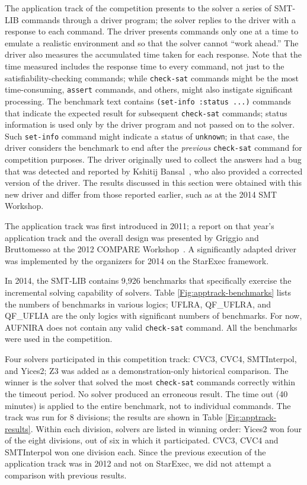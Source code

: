 \documentclass[twoside,11pt]{article}
\begin{document}
The application track of the competition presents to the solver a series of SMT-LIB commands through a driver program; the solver replies to the driver with a
response to each command. The driver presents commands only one at a time to emulate a realistic environment and so that the solver cannot ``work ahead.'' The driver also measures the accumulated time taken for each response. Note that the time measured includes the response time to every command, not just to the satisfiability-checking commands; while \lstinline{check-sat} commands might be the most time-consuming, \lstinline{assert} commands, and others, might also instigate significant processing. The benchmark text contains \lstinline{(set-info :status ...)} commands that
indicate the expected result for subsequent \lstinline{check-sat} commands; status information is used only by the driver program and not passed on to the solver. Such \lstinline{set-info} command might indicate a status of \lstinline{unknown}; in that case, the driver
considers the benchmark to end after the \emph{previous} \lstinline{check-sat} command for competition purposes.
The driver originally used to collect the answers had a bug that was
detected and reported by Kshitij Bansal~\cite{bansal2015email}, who
also provided a corrected version of the driver. The results discussed
in this section were obtained with this new driver and differ from those reported
earlier, such as at the 2014 SMT Workshop.

The application track was first introduced in 2011; a report on that year's application track and the overall design was presented by Griggio and Bruttomesso at the 2012 COMPARE Workshop~\cite{ag+rb+12}. A significantly adapted driver was implemented by the organizers for 2014 on the StarExec framework.

In 2014, the SMT-LIB contains 9,926 benchmarks that  specifically  exercise the incremental solving capability of solvers. Table \ref{Fig:apptrack-benchmarks} lists the numbers of benchmarks in various logics; UFLRA, QF\_UFLRA, and QF\_UFLIA are the only logics with significant numbers of benchmarks. For now, AUFNIRA does not contain any valid \lstinline{check-sat} command. All the benchmarks were used in the competition.

Four solvers participated in this competition track: CVC3, CVC4, SMTInterpol, and Yices2; Z3 was added as a demonstration-only historical comparison. The winner is the solver that solved the most \lstinline{check-sat} commands correctly within the timeout period. No solver produced an erroneous result. The time out (40 minutes) is applied to the entire benchmark, not to individual commands. The track was run for 8 divisions; the results are shown in Table \ref{Fig:apptrack-results}. Within each division, solvers are listed in winning order: Yices2 won four of the eight divisions, out of six in which it participated. CVC3, CVC4 and SMTInterpol won one division each. Since the previous execution of the application track was in 2012 and not on StarExec, we did not attempt a comparison with previous results.
\end{document}
